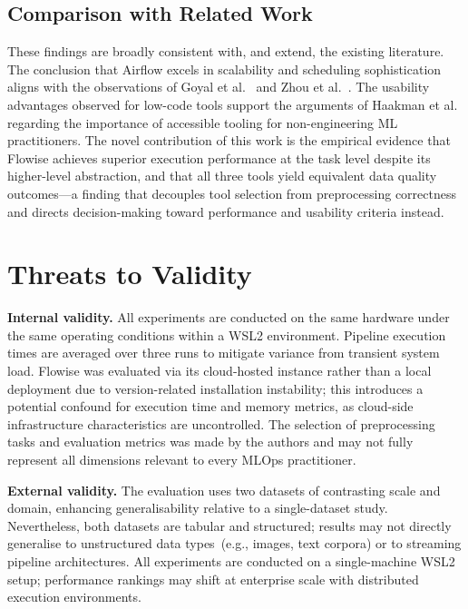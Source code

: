\documentclass[journal]{IEEEtran}
\begin{document}
\subsection{Comparison with Related Work}

These findings are broadly consistent with, and extend, the existing
literature. The conclusion that Airflow excels in scalability and
scheduling sophistication aligns with the observations of
Goyal et al.~\cite{goyal2023automated} and Zhou et al.~\cite{zhou2020towards}.
The usability advantages observed for low-code tools support the
arguments of Haakman et al.~\cite{haakman2021ai} regarding the
importance of accessible tooling for non-engineering ML practitioners.
The novel contribution of this work is the empirical evidence that
Flowise achieves superior execution performance at the task level
despite its higher-level abstraction, and that all three tools yield
equivalent data quality outcomes---a finding that decouples tool
selection from preprocessing correctness and directs decision-making
toward performance and usability criteria instead.


\section{Threats to Validity}
\label{sec:threats}

\textbf{Internal validity.} All experiments are conducted on the same
hardware under the same operating conditions within a WSL2 environment.
Pipeline execution times are averaged over three runs to mitigate variance
from transient system load. Flowise was evaluated via its cloud-hosted
instance rather than a local deployment due to version-related installation
instability; this introduces a potential confound for execution time and
memory metrics, as cloud-side infrastructure characteristics are
uncontrolled. The selection of preprocessing tasks and evaluation metrics
was made by the authors and may not fully represent all dimensions relevant
to every MLOps practitioner.

\textbf{External validity.} The evaluation uses two datasets of contrasting
scale and domain, enhancing generalisability relative to a single-dataset
study. Nevertheless, both datasets are tabular and structured; results
may not directly generalise to unstructured data types~(e.g., images,
text corpora) or to streaming pipeline architectures. All experiments are
conducted on a single-machine WSL2 setup; performance rankings may shift
at enterprise scale with distributed execution environments.
\end{document}
